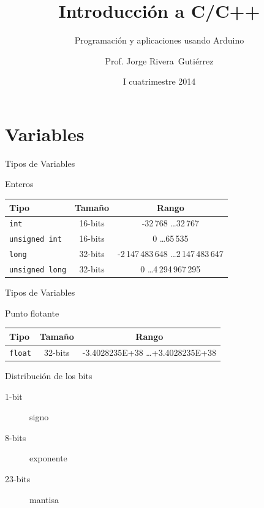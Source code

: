 \documentclass[handout,xcolor=dvipsnames]{beamer}
\title[C/C++]{Introducción a C/C++}
\subtitle{Programación y aplicaciones usando Arduino}
\author{Prof. Jorge Rivera~Guti\'errez}
\institute{Universidad Latina de Costa Rica\\ Ingenier\'\i a en Electr\'onica}
\date{I cuatrimestre 2014}
\newcommand{\pageframe}[1]{\frame{\begin{center}{ \Huge #1 }\end{center}}}
\begin{document}
\begin{frame}
 \maketitle
\end{frame}

\section{Variables}
\pageframe{Variables}

\begin{frame}{Tipos de Variables}
 \begin{block}{Enteros}
 \begin{tabular}{lcc}\hline
 	Tipo	& 	 Tamaño & Rango \\\hline\hline
{\tt int} &  16-bits & -32\,768 \ldots 32\,767 \\\hline
{\tt unsigned int}  & 16-bits &  0 \ldots 65\,535 \\\hline 
{\tt long}  & 32-bits & -2\,147\,483\,648 \ldots 2\,147\,483\,647 \\\hline
{\tt unsigned long}  & 32-bits &  0 \ldots 4\,294\,967\,295 \\\hline 
 \end{tabular}
 \end{block}
\end{frame}

\begin{frame}{Tipos de Variables}
 \begin{block}{Punto flotante}
 \begin{tabular}{lcc}\hline
 	Tipo	& 	 Tamaño & Rango \\\hline\hline
{\tt float} &  32-bits & -3.4028235E+38 \ldots +3.4028235E+38 \\\hline
 \end{tabular}
 \end{block}
 \begin{block}{Distribución de los bits}
 \begin{description}
 \item[1-bit] signo
 \item[8-bits] exponente
 \item[23-bits] mantisa
  \end{description}
 \end{block}
\end{frame}
\end{document}
